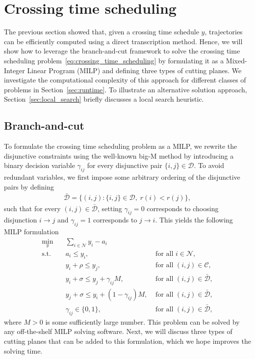 \documentclass[a4paper]{article}
\theoremstyle{definition}
\theoremstyle{plain}
\begin{document}
\section{Crossing time scheduling}
\label{sec:branch-and-cut}

The previous section showed that, given a crossing time schedule $y$,
trajectories can be efficiently computed using a direct transcription method.
Hence, we will show how to leverage the branch-and-cut framework to solve the
crossing time scheduling problem~\eqref{eq:crossing_time_scheduling} by formulating it as a Mixed-Integer Linear
Program (MILP) and defining three types of cutting planes. We investigate the
computational complexity of this approach for different classes of problems in
Section~\ref{sec:runtime}. To illustrate an alternative solution approach, Section~\ref{sec:local_search} briefly
discusses a local search heuristic.


\subsection{Branch-and-cut}

To formulate the crossing time scheduling problem as a MILP, we rewrite the
disjunctive constraints using the well-known big-M method by introducing a
binary decision variable $\gamma_{ij}$ for every disjunctive pair
$\{i, j\} \in \mathcal{D}$.
%
To avoid redundant variables, we first impose some arbitrary ordering of the
disjunctive pairs by defining
\begin{align*}
  \bar{\mathcal{D}} = \{ (i,j) : \{i,j\} \in \mathcal{D}, \; r(i) < r(j) \} ,
\end{align*}
such that for every $(i,j) \in \bar{\mathcal{D}}$, setting $\gamma_{ij} = 0$
corresponds to choosing disjunction $i \rightarrow j$ and $\gamma_{ij} = 1$ corresponds to
$j \rightarrow i$. This yields the following MILP formulation
%
\begin{align*}
  \min_{y} \quad & \sum_{i \in \mathcal{N}} y_{i} - a_{i} & \\
  \text{s.t.} \quad & a_{i} \leq y_{i} , & \text{ for all } i \in \mathcal{N} , \\
  & y_{i} + \rho \leq y_{j} , & \text{ for all } (i,j) \in \mathcal{C} , \\
  & y_{i} + \sigma \leq y_{j} + \gamma_{ij}M , & \text{ for all } (i,j) \in \bar{\mathcal{D}} , \\
  & y_{j} + \sigma \leq y_{i} + (1 - \gamma_{ij})M , & \text{ for all } (i,j) \in \bar{\mathcal{D}} , \\
  & \gamma_{ij} \in \{0, 1\} , & \text{ for all } (i,j) \in \bar{\mathcal{D}} ,
\end{align*}
where $M > 0$ is some sufficiently large number. This problem can be solved by
any off-the-shelf MILP solving software. Next, we will discuss three types of
cutting planes that can be added to this formulation, which we hope improves the
solving time.
\end{document}
